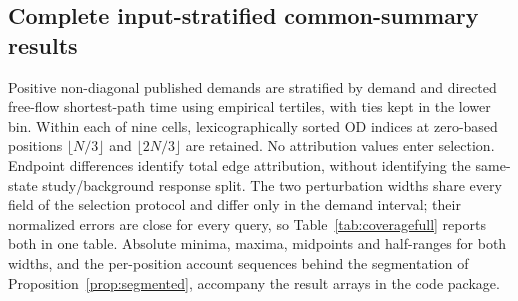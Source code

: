 \subsection{Complete input-stratified common-summary results}\label{sec:coverage}
Positive non-diagonal published demands are stratified by demand and directed free-flow shortest-path time using empirical tertiles, with ties kept in the lower bin. Within each of nine cells, lexicographically sorted OD indices at zero-based positions $\lfloor N/3\rfloor$ and $\lfloor2N/3\rfloor$ are retained. No attribution values enter selection. Endpoint differences identify total edge attribution, without identifying the same-state study/background response split. The two perturbation widths share every field of the selection protocol and differ only in the demand interval; their normalized errors are close for every query, so Table~\ref{tab:coveragefull} reports both in one table. Absolute minima, maxima, midpoints and half-ranges for both widths, and the per-position account sequences behind the segmentation of Proposition~\ref{prop:segmented}, accompany the result arrays in the code package.
